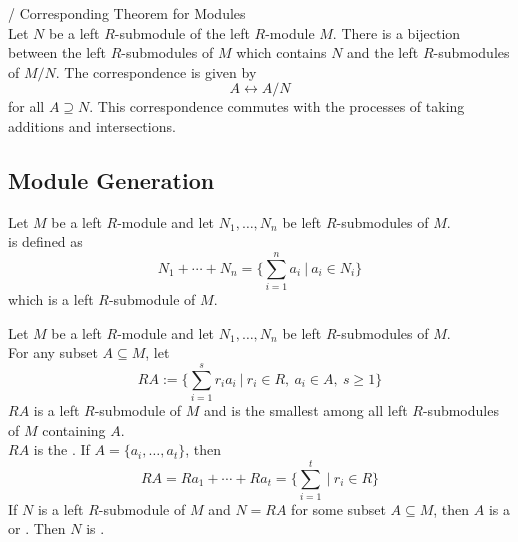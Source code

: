 \begin{theorem}
/ Corresponding Theorem for Modules \\
Let $N$ be a left $R$-submodule of the left $R$-module $M$. There is a bijection between the left $R$-submodules of $M$ which contains $N$ and the left $R$-submodules of $M/N$. The correspondence is given by
\begin{equation}
A \leftrightarrow A/N \nonumber
\end{equation}
for all $A \supseteq N$. This correspondence commutes with the processes of taking additions and intersections.
\end{theorem}

\subsection{Module Generation}

\begin{definition}
Let $M$ be a left $R$-module and let $N_1, \ldots, N_n$ be left $R$-submodules of $M$.\\
 is defined as
\begin{equation}
N_1 + \cdots + N_n = \{\sum_{i=1}^n a_i \ | \ a_i \in N_i\} \nonumber
\end{equation}
which is a left $R$-submodule of $M$.
\end{definition}

\begin{definition}
Let $M$ be a left $R$-module and let $N_1, \ldots, N_n$ be left $R$-submodules of $M$.\\
For any subset $A \subseteq M$, let
\begin{equation}
RA := \{\sum_{i=1}^s r_i a_i \ | \ r_i \in R, \ a_i \in A, \ s \geq 1\} \nonumber
\end{equation}
$RA$ is a left $R$-submodule of $M$ and is the smallest among all left $R$-submodules of $M$ containing $A$.\\
$RA$ is the . If $A = \{a_i, \ldots, a_t\}$, then
\begin{equation}
RA = Ra_1 + \cdots + Ra_t = \{\sum_{i=1}^t \ | \ r_i \in R\} \nonumber
\end{equation}
If $N$ is a left $R$-submodule of $M$ and $N = RA$ for some subset $A \subseteq M$, then $A$ is a  or . Then $N$ is .
\end{definition}

